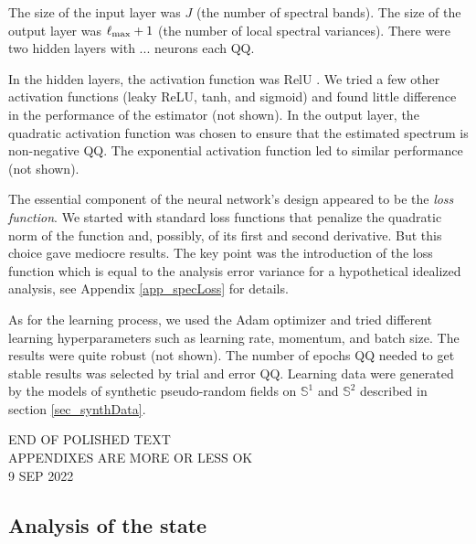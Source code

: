 \documentclass[12pt]{article}
\renewcommand{\S}{{\mathbb S}}
\newcommand{\red}{\textcolor[rgb]{1,0,0}}
\begin{document}
The size of the input layer was $J$ (the number of spectral bands).
The size of the  output layer was $\ell_{\rm max}+1$ (the number of local spectral variances).
There were two hidden layers with ... neurons each QQ.

In the hidden layers, the activation function was RelU \citep{Goodfellow}.
We  tried a few other activation functions (leaky ReLU, tanh, and sigmoid) and found
little difference in the performance of the estimator (not shown).
In the output layer, the quadratic activation function was chosen to ensure that the 
estimated spectrum is non-negative QQ. The 
exponential activation function led to similar performance (not shown).

The essential component of the neural network's design appeared to be the
{\em loss function}.
We started with standard loss functions that penalize the quadratic norm
of the function and, possibly, of its first and second derivative.
But this choice gave mediocre results.
The key point was the introduction of the loss function 
 which is equal to the analysis error variance for a hypothetical
idealized analysis, see Appendix \ref{app_specLoss}  for details. 

As for the learning process, we used the Adam optimizer and
tried different learning hyperparameters such as 
learning rate, momentum, and batch size. The results were quite robust (not shown).
The number of epochs QQ needed to get stable results was selected by trial and error QQ.
Learning data were generated by the models of synthetic pseudo-random fields 
on $\S^1$ and  $\S^2$ described in section \ref{sec_synthData}.



\red{END OF POLISHED TEXT \\
APPENDIXES ARE MORE OR LESS OK\\
 9 SEP 2022
}


\subsection {Analysis of the state}
\label{sec_anls}
\end{document}
